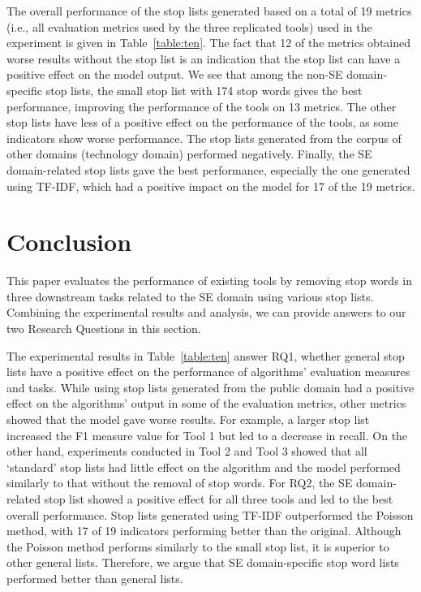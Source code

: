 \documentclass[conference]{IEEEtran}
\begin{document}
\begin{sloppy}
The overall performance of the stop lists generated based on a total of 19 metrics (i.e., all evaluation metrics used by the three replicated tools) used in the experiment is given in Table~\ref{table:ten}. The fact that 12 of the metrics obtained worse results without the stop list is an indication that the stop list can have a positive effect on the model output. We see that among the non-SE domain-specific stop lists, the small stop list with 174 stop words gives the best performance, improving the performance of the tools on 13 metrics. The other stop lists have less of a positive effect on the performance of the tools, as some indicators show worse performance. The stop lists generated from the corpus of other domains (technology domain) performed negatively. Finally, the SE domain-related stop lists gave the best performance, especially the one generated using TF-IDF, which had a positive impact on the model for 17 of the 19 metrics. 

\section{Conclusion}
This paper evaluates the performance of existing tools by removing stop words in three downstream tasks related to the SE domain using various stop lists. Combining the experimental results and analysis, we can provide answers to our two Research Questions in this section. 
 
The experimental results in Table~\ref{table:ten} answer RQ1, whether general stop lists have a positive effect on the performance of algorithms' evaluation measures and tasks. While using stop lists generated from the public domain had a positive effect on the algorithms' output in some of the evaluation metrics, other metrics showed that the model gave worse results. For example, a larger stop list increased the F1 measure value for Tool 1 but led to a decrease in recall. On the other hand, experiments conducted in Tool 2 and Tool 3 showed that all `standard' stop lists had little effect on the algorithm and the model performed similarly to that without the removal of stop words. For RQ2, the SE domain-related stop list showed a positive effect for all three tools and led to the best overall performance. Stop lists generated using TF-IDF outperformed the Poisson method, with 17 of 19 indicators performing better than the original. Although the Poisson method performs similarly to the small stop list, it is superior to other general lists. Therefore, we argue that SE domain-specific stop word lists performed better than general lists. 
 

\end{sloppy}
\end{document}
